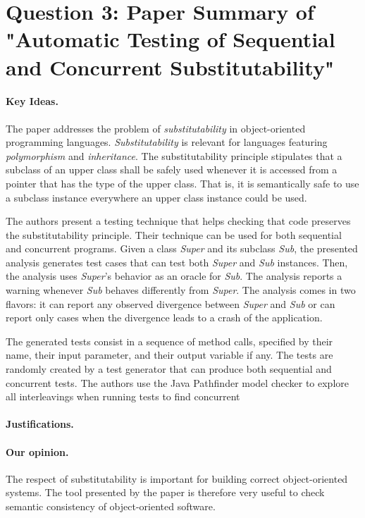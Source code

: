 \section*{Question 3: Paper Summary of "Automatic Testing of Sequential and Concurrent Substitutability"}

\newcommand{\mysub}{substitutability}
\newcommand{\mySub}{Substitutability}

\paragraph{Key Ideas.}
The paper addresses the problem of \textit{\mysub} in 
object-oriented programming languages. \textit{\mySub} is relevant
for languages featuring \textit{polymorphism} and \textit{inheritance}.
The \mysub{} principle stipulates that a subclass of an upper
class shall be safely used whenever it is accessed from a
pointer that has the type of the upper class. That is, it is
semantically safe to use a subclass instance everywhere an
upper class instance could be used.

The authors present a testing technique that helps checking
that code preserves the \mysub{} principle. Their technique
can be used for both sequential and concurrent programs.
Given a class \textit{Super} and its subclass \textit{Sub}, the
presented analysis generates test cases that can test both
\textit{Super} and \textit{Sub} instances. Then, the analysis
uses \textit{Super}'s behavior as an oracle for \textit{Sub}.
The analysis reports a warning whenever \textit{Sub} behaves
differently from \textit{Super}. The analysis comes in two
flavors: it can report any observed divergence between \textit{Super}
and \textit{Sub} or can report only cases when the divergence 
leads to a crash of the application.

The generated tests consist in a sequence of method calls,
specified by their name, their input parameter, and their
output variable if any. The tests are randomly created by
a test generator that can produce both sequential and
concurrent tests. The authors use the Java Pathfinder
model checker to explore all interleavings when running
tests to find concurrent 

\paragraph{Justifications.}


\paragraph{Our opinion.}
The respect of \mysub{} is important for building correct
object-oriented systems. The tool presented by the paper
is therefore very useful to check semantic consistency of
object-oriented software.

